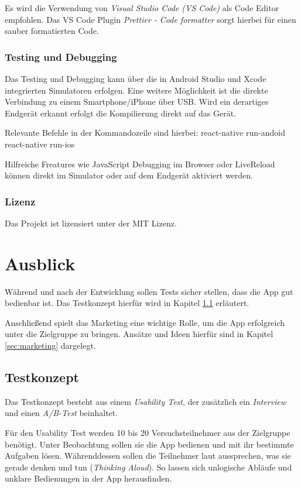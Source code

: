 Es wird die Verwendung von \emph{Visual Studio Code (VS Code)} als Code Editor empfohlen.
Das VS Code Plugin \emph{Prettier - Code formatter} sorgt hierbei für einen sauber formatierten Code.


\subsection{Testing und Debugging}
Das Testing und Debugging kann über die in Android Studio und Xcode integrierten Simulatoren erfolgen.
Eine weitere Möglichkeit ist die direkte Verbindung zu einem Smartphone/iPhone über USB.
Wird ein derartiges Endgerät erkannt erfolgt die Kompilierung direkt auf das Gerät.

Relevante Befehle in der Kommandozeile sind hierbei:
react-native run-andoid
react-native run-ios

Hilfreiche Freatures wie JavaScript Debugging im Browser oder LiveReload können direkt im Simulator oder auf dem Endgerät aktiviert werden.


\subsection{Lizenz}
Das Projekt ist lizensiert unter der MIT Lizenz.







\chapter{Ausblick}
\label{ausblick}
Während und nach der Entwicklung sollen Tests sicher stellen, dass die App gut bedienbar ist. Das Testkonzept hierfür wird in Kapitel \ref{sec:testkonzept} erläutert.

Anschließend spielt das Marketing eine wichtige Rolle, um die App erfolgreich unter die Zielgruppe zu bringen. Ansätze und Ideen hierfür sind in Kapitel \ref{sec:marketing} dargelegt.

\section{Testkonzept}
\label{sec:testkonzept}
Das Testkonzept besteht aus einem \emph{Usability Test}, der zusätzlich ein \emph{Interview} und einen \emph{A/B-Test} beinhaltet.

Für den Usability Test werden 10 bis 20  Versuchsteilnehmer aus der Zielgruppe benötigt. Unter Beobachtung sollen sie die App bedienen und mit ihr bestimmte Aufgaben lösen. Währenddessen sollen die Teilnehmer laut aussprechen, was sie gerade denken und tun (\emph{Thinking Aloud}). So lassen sich unlogische Abläufe und unklare Bedienungen in der App herausfinden.


